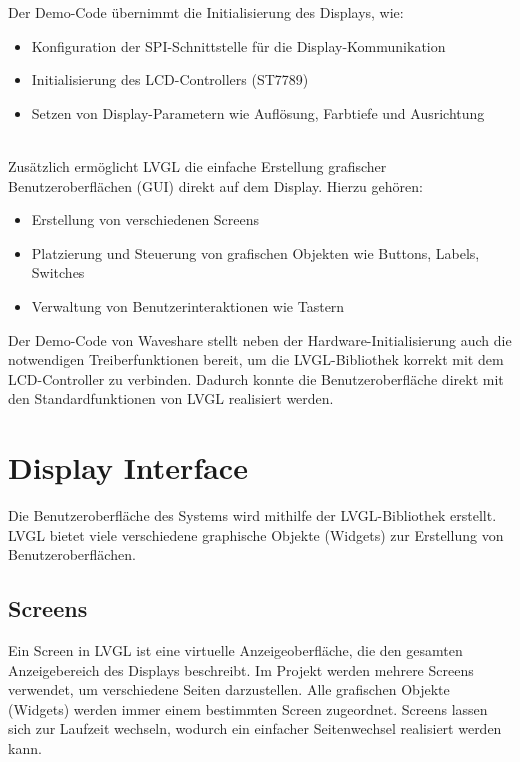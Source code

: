 \begin{inhalt}
Der Demo-Code übernimmt die Initialisierung des Displays, wie:
\begin{itemize}
    \item Konfiguration der SPI-Schnittstelle für die Display-Kommunikation
    \item Initialisierung des LCD-Controllers (ST7789)
    \item Setzen von Display-Parametern wie Auflösung, Farbtiefe und Ausrichtung
\end{itemize}

\bigskip \\

Zusätzlich ermöglicht LVGL die einfache Erstellung grafischer Benutzeroberflächen (GUI) direkt auf dem Display. Hierzu gehören:
\begin{itemize}
    \item Erstellung von verschiedenen Screens
    \item Platzierung und Steuerung von grafischen Objekten wie Buttons, Labels, Switches
    \item Verwaltung von Benutzerinteraktionen wie Tastern
\end{itemize}

Der Demo-Code von Waveshare stellt neben der Hardware-Initialisierung auch die notwendigen Treiberfunktionen bereit, um die LVGL-Bibliothek korrekt mit dem LCD-Controller zu verbinden. Dadurch konnte die Benutzeroberfläche direkt mit den Standardfunktionen von LVGL realisiert werden.


\section{Display Interface}

Die Benutzeroberfläche des Systems wird mithilfe der LVGL-Bibliothek erstellt. LVGL bietet viele verschiedene graphische Objekte (Widgets) zur Erstellung von Benutzeroberflächen. 

\subsection{Screens}

Ein Screen in LVGL ist eine virtuelle Anzeigeoberfläche, die den gesamten Anzeigebereich des Displays beschreibt. Im Projekt werden mehrere Screens verwendet, um verschiedene Seiten darzustellen. Alle grafischen Objekte (Widgets) werden immer einem bestimmten Screen zugeordnet. Screens lassen sich zur Laufzeit wechseln, wodurch ein einfacher Seitenwechsel realisiert werden kann.


\end{inhalt}
